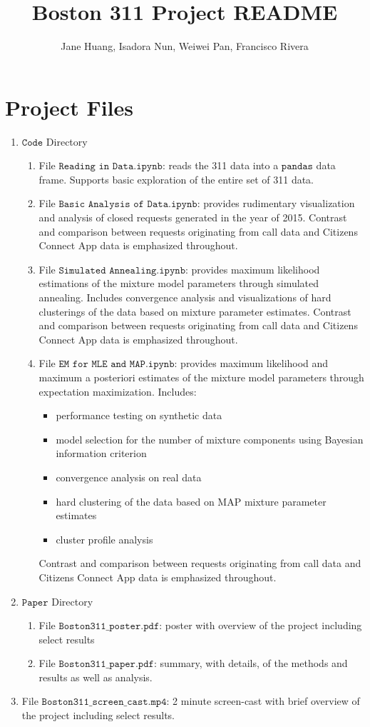 \documentclass{article}
\title{\textbf{\Large{Boston 311 Project README} }  }
\author{Jane Huang, Isadora Nun, Weiwei Pan, Francisco Rivera}
\date{}
\theoremstyle{theorem}
\theoremstyle{theorem}
\theoremstyle{theorem}
\theoremstyle{lemma}
\theoremstyle{definition}
\theoremstyle{example}
\begin{document}
\maketitle


\section{Project Files}
\begin{enumerate}
\item $\texttt{Code}$ Directory
\begin{enumerate}
\item File $\texttt{Reading in Data.ipynb}$: reads the 311 data into a $\texttt{pandas}$ data frame. Supports basic exploration of the entire set of 311 data.
\item File $\texttt{Basic Analysis of Data.ipynb}$: provides rudimentary visualization and analysis of closed requests generated in the year of 2015. Contrast and comparison between requests originating from call data and Citizens Connect App data is emphasized throughout.
\item File $\texttt{Simulated Annealing.ipynb}$: provides maximum likelihood estimations of the mixture model parameters through simulated annealing. Includes convergence analysis and visualizations of hard clusterings of the data based on mixture parameter estimates. Contrast and comparison between requests originating from call data and Citizens Connect App data is emphasized throughout.
\item File $\texttt{EM for MLE and MAP.ipynb}$: provides maximum likelihood and maximum a posteriori estimates of the mixture model parameters through expectation maximization. Includes:
\begin{itemize}
\item performance testing on synthetic data
\item model selection for the number of mixture components using Bayesian information criterion
\item convergence analysis on real data
\item hard clustering of the data based on MAP mixture parameter estimates
\item cluster profile analysis
\end{itemize}
Contrast and comparison between requests originating from call data and Citizens Connect App data is emphasized throughout.
\end{enumerate}
\item $\texttt{Paper}$ Directory
\begin{enumerate}
\item File $\texttt{Boston311\_poster.pdf}$: poster with overview of the project including select results
\item File $\texttt{Boston311\_paper.pdf}$: summary, with details, of the methods and results as well as analysis. 
\end{enumerate}
\item File $\texttt{Boston311\_screen\_cast.mp4}$: 2 minute screen-cast with brief overview of the project including select results.
\end{enumerate}
\end{document}

